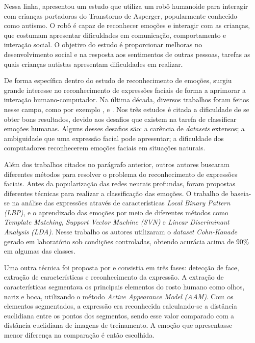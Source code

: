 \documentclass[
12pt,				%
openright,			%
oneside,			%
a4paper,			%
english,			%
french,				%
spanish,			%
brazil				%
]{abntex2}
\begin{document}
Nessa linha,  apresentou um estudo que utiliza um robô humanoide para interagir com crianças portadoras do Transtorno de Asperger, popularmente conhecido como autismo. O robô é capaz de reconhecer emoções e interagir com as crianças, que costumam apresentar dificuldades em comunicação, comportamento e interação social. O objetivo do estudo é proporcionar melhoras no desenvolvimento social e na resposta aos sentimentos de outras pessoas, tarefas as quais crianças autistas apresentam dificuldades em realizar.

De forma específica dentro do estudo de reconhecimento de emoções, surgiu grande interesse no reconhecimento de expressões faciais de forma a aprimorar a interação humano-computador. Na última década, diversos trabalhos foram feitos nesse campo, como por exemplo \cite{sarode2010facial}, \cite{manglik2004facial} e \cite{bartlett2003real}. Nos três estudos é citada a dificuldade de se obter bons resultados, devido aos desafios que existem na tarefa de classificar emoções humanas. Alguns desses desafios são: a carência de \textit{datasets} extensos; a ambiguidade que uma expressão facial pode apresentar; a dificuldade dos computadores reconhecerem emoções faciais em situações naturais.
    
Além dos trabalhos citados no parágrafo anterior, outros autores buscaram diferentes métodos para resolver o problema do reconhecimento de expressões faciais. Antes da popularização das redes neurais profundas,  foram propostas diferentes técnicas para realizar a classificação das emoções. O trabalho de \cite{shan2009facial} baseia-se na análise das expressões através de características \textit{Local Binary Pattern (LBP)}, e o aprendizado das emoções por meio de diferentes métodos como \textit{Template Matching}, \textit{Support Vector Machine (SVN)} e \textit{Linear Discriminant Analysis (LDA)}. Nesse trabalho os autores utilizaram o \textit{dataset} \textit{Cohn-Kanade} \cite{kanade2000comprehensive} gerado em laboratório sob condições controladas, obtendo acurácia acima de 90\% em algumas das classes.

Uma outra técnica foi proposta por \cite{dhavalikar2014face} e consistia em três fases: detecção de face, extração de características e reconhecimento da expressão. A extração de características segmentava os principais elementos do rosto humano como olhos, nariz e boca, utilizando o método \textit{Active Appearance Model (AAM)}. Com os elementos segmentados, a expressão era reconhecida calculando-se a distância euclidiana entre os pontos dos segmentos, sendo esse valor comparado com a distância euclidiana de imagens de treinamento. A emoção que apresentasse menor diferença na comparação é então escolhida.
\end{document}
